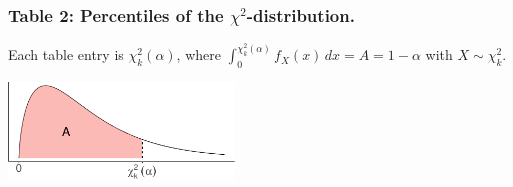 \documentclass[
]{article}
\begin{document}
\newpage

\hypertarget{table-2-percentiles-of-the-chi2-distribution.}{%
\subsubsection{\texorpdfstring{Table 2: Percentiles of the
\(\chi^2\)-distribution.}{Table 2: Percentiles of the \textbackslash chi\^{}2-distribution.}}\label{table-2-percentiles-of-the-chi2-distribution.}}

Each table entry is \(\chi^2_k(\alpha)\), where
\(\int_{0}^{\chi^2_k(\alpha)}f_X(x) \, dx = A = 1-\alpha\) with
\(X\sim\chi^2_k\).

\begin{center}\includegraphics[width=6cm]{figure/unnamed-chunk-3-1} \end{center}
\end{document}
